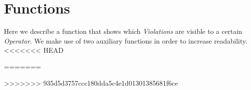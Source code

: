 \section{Functions}
Here we describe a function that shows which \emph{Violations} are visible to
a certain \emph{Operator}. We make use of two auxiliary functions in order to
increase readability.
<<<<<<< HEAD

=======

>>>>>>> 935d5d3757ccc180dda5c4e1d01301385681f6ce
